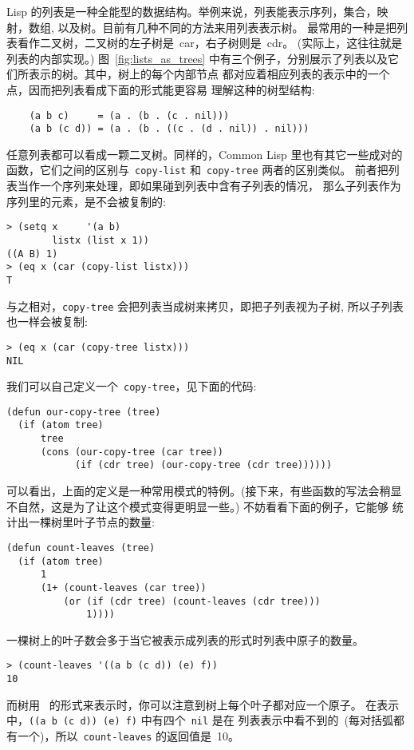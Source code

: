 Lisp 的列表是一种全能型的数据结构。举例来说，列表能表示序列，集合，映射，数组,
以及树。目前有几种不同的方法来用列表表示树。
最常用的一种是把列表看作二叉树，二叉树的左子树是~car，右子树则是~cdr。
(实际上，这往往就是列表的内部实现。) 图~\ref{fig:lists_as_trees}
中有三个例子，分别展示了列表以及它们所表示的树。其中，树上的每个内部节点
都对应着相应列表的\cons{}表示中的一个点，因而把列表看成下面的形式能更容易
理解这种的树型结构:
\begin{lstlisting}
    (a b c)     = (a . (b . (c . nil)))
    (a b (c d)) = (a . (b . ((c . (d . nil)) . nil)))
\end{lstlisting}
任意列表都可以看成一颗二叉树。同样的，Common Lisp 里也有其它一些成对的函数，它们之间的区别与~\texttt{copy-list} 
和~\texttt{copy-tree} 两者的区别类似。
前者把列表当作一个序列来处理，即如果碰到列表中含有子列表的情况，
那么子列表作为序列里的元素，是不会被复制的:
\begin{lstlisting}
> (setq x     '(a b)
        listx (list x 1))
((A B) 1)
> (eq x (car (copy-list listx)))
T
\end{lstlisting}
与之相对，\texttt{copy-tree} 会把列表当成树来拷贝，即把子列表视为子树,
所以子列表也一样会被复制:
\begin{lstlisting}
> (eq x (car (copy-tree listx)))
NIL
\end{lstlisting}
我们可以自己定义一个~\texttt{copy-tree}，见下面的代码:
\begin{lstlisting}
(defun our-copy-tree (tree)
  (if (atom tree)
      tree
      (cons (our-copy-tree (car tree))
            (if (cdr tree) (our-copy-tree (cdr tree))))))
\end{lstlisting}
可以看出，上面的定义是一种常用模式的特例。(接下来，有些函数的写法会稍显
不自然，这是为了让这个模式变得更明显一些。) 不妨看看下面的例子，它能够
统计出一棵树里叶子节点的数量:
\begin{lstlisting}
(defun count-leaves (tree)
  (if (atom tree)
      1
      (1+ (count-leaves (car tree))
          (or (if (cdr tree) (count-leaves (cdr tree)))
              1))))
\end{lstlisting}
一棵树上的叶子数会多于当它被表示成列表的形式时列表中原子的数量。
\begin{lstlisting}
> (count-leaves '((a b (c d)) (e) f))
10
\end{lstlisting}
而树用~\emph{\cons{}} 的形式来表示时，你可以注意到树上每个叶子都对应一个原子。
在\cons{}表示中，\texttt{((a b (c d)) (e) f)} 中有四个~\texttt{nil} 是在
列表表示中看不到的~(每对括弧都有一个)，所以~\texttt{count-leaves} 的返回值是~10。

